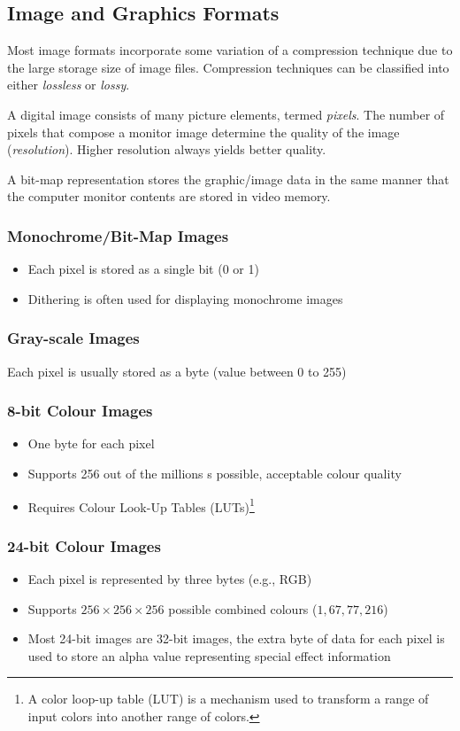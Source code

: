  \subsection{Image and Graphics Formats} 
  Most image formats incorporate some variation of a compression technique due to the large storage size of image files. Compression techniques can be classified into either \textit{lossless} or \textit{lossy}.
  
  A digital image consists of many picture elements, termed \textit{pixels}. The number of pixels that compose a monitor image determine the quality of the image (\textit{resolution}). Higher resolution always yields better quality.
  
  A bit-map representation stores the graphic/image data in the same manner that the computer monitor contents are stored in video memory.
  
  \subsubsection*{Monochrome/Bit-Map Images}
  \begin{itemize}
  	\item Each pixel is stored as a single bit (0 or 1)
  	\item Dithering is often used for displaying monochrome images
  \end{itemize}
  
  \subsubsection*{Gray-scale Images}
  Each pixel is usually stored as a byte (value between 0 to 255)
  
  \subsubsection*{8-bit Colour Images}
  \begin{itemize}
  	\item One byte for each pixel
  	\item Supports 256 out of the millions s possible, acceptable colour quality
  	\item Requires Colour Look-Up Tables (LUTs)\footnote{A color loop-up table (LUT) is a mechanism used to transform a range of input colors into another range of colors. }
  \end{itemize}
  
  \subsubsection*{24-bit Colour Images}
  \begin{itemize}
  	\item Each pixel is represented by three bytes (e.g., RGB)
  	\item Supports $ 256 \times 256 \times 256 $ possible combined colours ($ 1,67,77,216 $)
  	\item Most 24-bit images are 32-bit images, the extra byte of data for each pixel is used to store an alpha value representing special effect information
  \end{itemize}
  
